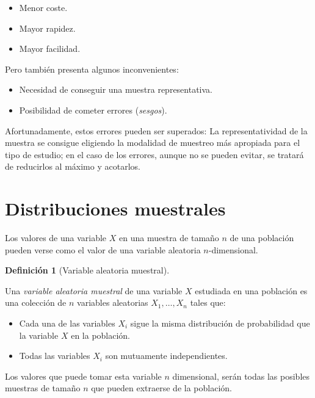 \documentclass[
  a4paper,
]{scrreport}
\providecommand{\tightlist}{%
  \setlength{\itemsep}{0pt}\setlength{\parskip}{0pt}}\usepackage{longtable,booktabs,array}
\theoremstyle{plain}
\theoremstyle{definition}
\newtheorem{definition}{Definición}[chapter]
\theoremstyle{definition}
\theoremstyle{remark}
\begin{document}
\begin{itemize}
\tightlist
\item
  Menor coste.
\item
  Mayor rapidez.
\item
  Mayor facilidad.
\end{itemize}

Pero también presenta algunos inconvenientes:

\begin{itemize}
\tightlist
\item
  Necesidad de conseguir una muestra representativa.
\item
  Posibilidad de cometer errores (\emph{sesgos}).
\end{itemize}

Afortunadamente, estos errores pueden ser superados: La
representatividad de la muestra se consigue eligiendo la modalidad de
muestreo más apropiada para el tipo de estudio; en el caso de los
errores, aunque no se pueden evitar, se tratará de reducirlos al máximo
y acotarlos.

\section{Distribuciones muestrales}\label{distribuciones-muestrales}

Los valores de una variable \(X\) en una muestra de tamaño \(n\) de una
población pueden verse como el valor de una variable aleatoria
\(n\)-dimensional.

\begin{definition}[Variable aleatoria
muestral]\protect\hypertarget{def-variable-aleatoria-muestral}{}\label{def-variable-aleatoria-muestral}

Una \emph{variable aleatoria muestral} de una variable \(X\) estudiada
en una población es una colección de \(n\) variables aleatorias
\(X_1,\ldots,X_n\) tales que:

\begin{itemize}
\tightlist
\item
  Cada una de las variables \(X_i\) sigue la misma distribución de
  probabilidad que la variable \(X\) en la población.
\item
  Todas las variables \(X_i\) son mutuamente independientes.
\end{itemize}

\end{definition}

Los valores que puede tomar esta variable \(n\) dimensional, serán todas
las posibles muestras de tamaño \(n\) que pueden extraerse de la
población.
\end{document}
